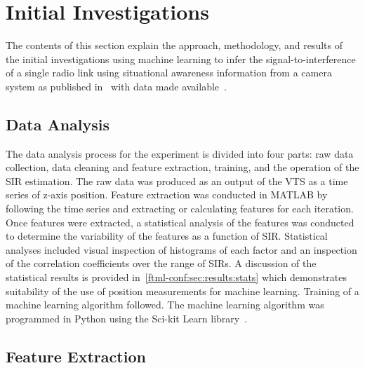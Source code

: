 \section{Initial Investigations}

The contents of this section explain the approach, methodology, and results of the initial investigations using machine learning to infer the signal-to-interference of a single radio link using situational awareness information from a camera system as published in~\cite{CandellISIE2019} with data made available~\cite{https://doi.org/10.18434/m32077}.

\subsection{Data Analysis}\label{ftml-conf:sec:dataanalysis}


The data analysis process for the experiment
is divided into four parts: raw data collection, data cleaning and feature extraction, training, and the operation of the SIR estimation.  The raw data was produced as an output of the VTS as a time series of z-axis position.  Feature extraction was conducted in MATLAB by following the time series and extracting or calculating features for each iteration.  Once features were extracted, a statistical analysis of the features was conducted to determine the variability of the features as a function of SIR.  Statistical analyses included visual inspection of histograms of each factor and an inspection of the correlation coefficients over the range  of SIRs.  A discussion of the statistical results is provided in~\ref{ftml-conf:sec:results:stats} which demonstrates suitability of the use of position measurements for machine learning. Training of a machine learning algorithm followed. The machine learning algorithm was programmed in Python using the Sci-kit Learn library~\cite{SCIKITLEARN}.

\subsection{Feature Extraction}\label{ftml-conf:sec:data:feats}

